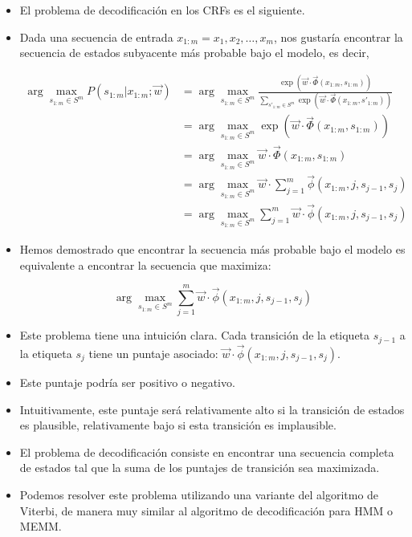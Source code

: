 \begin{itemize}

\item El problema de decodificación en los CRFs es el siguiente.
\item Dada una secuencia de entrada $x_{1:m} = x_1, x_2, \dots, x_m$, nos gustaría encontrar la secuencia de estados subyacente más probable bajo el modelo, es decir,

\begin{equation}
\begin{split}
\operatorname{arg} \max_{s_{1:m} \in S^m} P(s_{1:m}| x_{1:m}; \vec{w}) & = \operatorname{arg} \max_{s_{1:m} \in S^m} \frac{\exp (\vec{w} \cdot \vec{\Phi}(x_{1:m},s_{1:m}))}{\sum_{s'_{1:m} \in S^m}\exp (\vec{w} \cdot \vec{\Phi}(x_{1:m},s'_{1:m}))} \\
& = \operatorname{arg} \max_{s_{1:m} \in S^m} \exp (\vec{w} \cdot \vec{\Phi}(x_{1:m},s_{1:m})) \\
& = \operatorname{arg} \max_{s_{1:m} \in S^m} \vec{w} \cdot \vec{\Phi}(x_{1:m},s_{1:m}) \\
& = \operatorname{arg} \max_{s_{1:m} \in S^m} \vec{w} \cdot \sum_{j=1}^{m} \vec{\phi}(x_{1:m},j,s_{j-1},s_j) \\
& = \operatorname{arg} \max_{s_{1:m} \in S^m} \sum_{j=1}^{m} \vec{w} \cdot \vec{\phi}(x_{1:m},j,s_{j-1},s_j)
\end{split}
\end{equation}

\item Hemos demostrado que encontrar la secuencia más probable bajo el modelo es equivalente a encontrar la secuencia que maximiza:

\begin{displaymath}
\operatorname{arg} \max_{s_{1:m} \in S^m} \sum_{j=1}^{m} \vec{w} \cdot \vec{\phi}(x_{1:m},j,s_{j-1},s_j)
\end{displaymath}

\item Este problema tiene una intuición clara. Cada transición de la etiqueta $s_{j-1}$ a la etiqueta $s_j$ tiene un puntaje asociado: $\vec{w} \cdot \vec{\phi}(x_{1:m},j,s_{j-1},s_j)$.

\item Este puntaje podría ser positivo o negativo.

\item Intuitivamente, este puntaje será relativamente alto si la transición de estados es plausible, relativamente bajo si esta transición es implausible.

\item El problema de decodificación consiste en encontrar una secuencia completa de estados tal que la suma de los puntajes de transición sea maximizada.

\item Podemos resolver este problema utilizando una variante del algoritmo de Viterbi, de manera muy similar al algoritmo de decodificación para HMM o MEMM.

\end{itemize}


